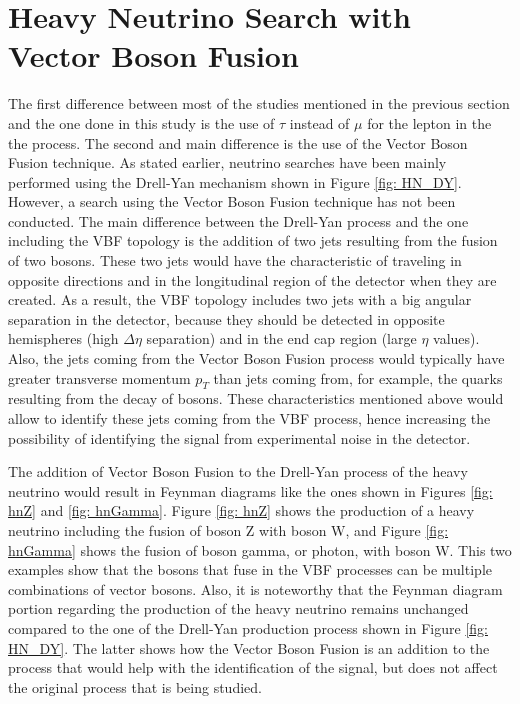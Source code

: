 \section{Heavy Neutrino Search with Vector Boson Fusion}

The first difference between most of the studies mentioned in the previous section and the one done in this study is the use of $\tau$ instead of $\mu$ for the lepton in the the process. The second and main difference is the use of the Vector Boson Fusion technique. As stated earlier, neutrino searches have been mainly performed using the Drell-Yan mechanism shown in Figure \ref{fig: HN_DY}. However, a search using the Vector Boson Fusion technique has not been conducted. The main difference between the Drell-Yan process and the one including the VBF topology is the addition of two jets resulting from the fusion of two bosons. These two jets would have the characteristic of traveling in opposite directions and in the longitudinal region of the detector when they are created. As a result, the VBF topology includes two jets with a big angular separation in the detector, because they should be detected in opposite hemispheres (high $\Delta \eta$ separation) and in the end cap region (large $\eta$ values). Also, the jets coming from the Vector Boson Fusion process would typically have greater transverse momentum $p_{T}$ than jets coming from, for example, the quarks resulting from the decay of bosons. These characteristics mentioned above would allow to identify these jets coming from the VBF process, hence increasing the possibility of identifying the signal from experimental noise in the detector.

The addition of Vector Boson Fusion to the Drell-Yan process of the heavy neutrino would result in Feynman diagrams like the ones shown in Figures \ref{fig: hnZ} and \ref{fig: hnGamma}. Figure \ref{fig: hnZ} shows the production of a heavy neutrino including the fusion of boson Z with boson W, and Figure \ref{fig: hnGamma} shows the fusion of boson gamma, or photon, with boson W. This two examples show that the bosons that fuse in the VBF processes can be multiple combinations of vector bosons. Also, it is noteworthy that the Feynman diagram portion regarding the production of the heavy neutrino remains unchanged compared to the one of the Drell-Yan production process shown in Figure \ref{fig: HN_DY}. The latter shows how the Vector Boson Fusion is an addition to the process that would help with the identification of the signal, but does not affect the original process that is being studied. 

